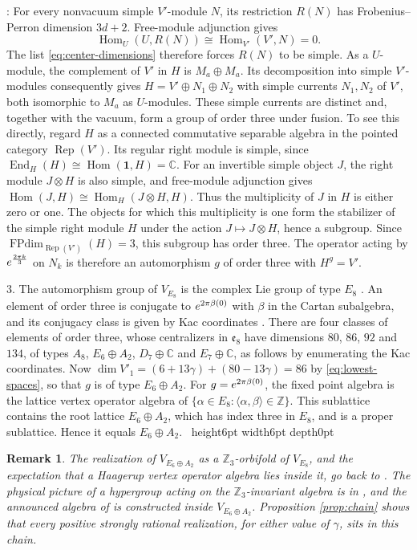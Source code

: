 \documentclass[leqno]{article}
\newcommand{\Cbb}{\ensuremath{\mathbb{C}}}
\newcommand{\Z}{\ensuremath{\mathbb{Z}}}
\newcommand{\qed}{\hfill \vrule height6pt  width6pt depth0pt}
\newcommand{\ot}{\otimes}
\let\i\relax
\newcommand{\i}{\mathrm{i}}
\DeclareMathOperator{\Rep}{Rep}
\newtheorem{remark}[thm]{Remark}
\newenvironment{proof}[1][]{\noindent {\it Proof #1} : }{\hbox{~}\qed
\smallskip
}
\numberwithin{equation}{section}
\begin{document}
\begin{proof}
For every nonvacuum simple $V'$-module $N$, its restriction $R(N)$ has Frobenius--Perron dimension $3d+2$. Free-module adjunction gives
\[
\operatorname{Hom}_U(U,R(N)) \cong \operatorname{Hom}_{V'}(V',N) = 0.
\]
The list \eqref{eq:center-dimensions} therefore forces $R(N)$ to be simple. As a $U$-module, the complement of $V'$ in $H$ is $M_a \oplus M_a$. Its decomposition into simple $V'$-modules consequently gives $H = V' \oplus N_1 \oplus N_2$ with simple currents $N_1, N_2$ of $V'$, both isomorphic to $M_a$ as $U$-modules. These simple currents are distinct and, together with the vacuum, form a group of order three under fusion. To see this directly, regard $H$ as a connected commutative separable algebra in the pointed category $\Rep(V')$. Its regular right module is simple, since $\operatorname{End}_H(H) \cong \operatorname{Hom}(\mathbf 1,H) = \Cbb$. For an invertible simple object $J$, the right module $J \ot H$ is also simple, and free-module adjunction gives $\operatorname{Hom}(J,H) \cong \operatorname{Hom}_H(J \ot H,H)$. Thus the multiplicity of $J$ in $H$ is either zero or one. The objects for which this multiplicity is one form the stabilizer of the simple right module $H$ under the action $J \mapsto J \ot H$, hence a subgroup. Since $\operatorname{FPdim}_{\Rep(V')}(H) = 3$, this subgroup has order three. The operator acting by $e^{\frac{2\pi\i k}{3}}$ on $N_k$ is therefore an automorphism $g$ of order three with $H^g = V'$.

3. The automorphism group of $V_{E_8}$ is the complex Lie group of type $E_8$ \cite[Theorem 2.1]{DoN99}. An element of order three is conjugate to $e^{2\pi\i\beta(0)}$ with $\beta$ in the Cartan subalgebra, and its conjugacy class is given by Kac coordinates \cite[Chapter 8]{Kac90}. There are four classes of elements of order three, whose centralizers in $\mathfrak e_8$ have dimensions $80$, $86$, $92$ and $134$, of types $A_8$, $E_6 \oplus A_2$, $D_7 \oplus \Cbb$ and $E_7 \oplus \Cbb$, as follows by enumerating the Kac coordinates. Now $\dim V'_1 = (6+13\gamma)+(80-13\gamma) = 86$ by \eqref{eq:lowest-spaces}, so that $g$ is of type $E_6 \oplus A_2$. For $g = e^{2\pi\i\beta(0)}$, the fixed point algebra is the lattice vertex operator algebra of $\{\alpha \in E_8 : \langle \alpha,\beta\rangle \in \Z\}$. This sublattice contains the root lattice $E_6 \oplus A_2$, which has index three in $E_8$, and is a proper sublattice. Hence it equals $E_6 \oplus A_2$.
\end{proof}

\begin{remark}\normalfont
\label{rem:chain-literature}
The realization of $V_{E_6 \oplus A_2}$ as a $\Z_3$-orbifold of $V_{E_8}$, and the expectation that a Haagerup vertex operator algebra lies inside it, go back to \cite[Section 2.4 p.~22]{EvG11}. The physical picture of a hypergroup acting on the $\Z_3$-invariant algebra is in \cite[Section 4.3 pp.~83--88]{GaR26}, and the announced algebra of \cite{Rie26,Hua26} is constructed inside $V_{E_6 \oplus A_2}$. Proposition \ref{prop:chain} shows that every positive strongly rational realization, for either value of $\gamma$, sits in this chain.
\end{remark}
\end{document}
